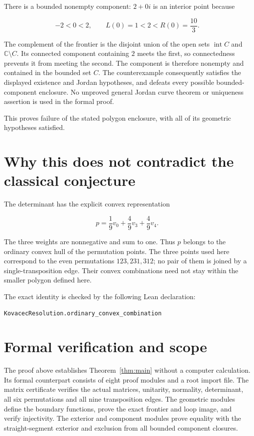 \documentclass[11pt]{article}
\begin{document}
There is a bounded nonempty component: \(2+0i\) is an interior point
because

\[
-2<0<2,\qquad L(0)=1<2<R(0)=\frac{10}{3}.
\]

The complement of the frontier is the disjoint union of the open sets $\operatorname{int}C$ and $\mathbb C\setminus C$. Its connected component containing $2$ meets the first, so connectedness prevents it from meeting the second. The component is therefore nonempty and contained in the bounded set $C$. The counterexample consequently satisfies the displayed
existence and Jordan hypotheses, and defeats every possible
bounded-component enclosure. No unproved general Jordan curve theorem or
uniqueness assertion is used in the formal proof.

This proves failure of the stated polygon enclosure, with all of its geometric hypotheses satisfied.

\section{Why this does not contradict the classical conjecture}\label{why-this-does-not-contradict-the-classical-conjecture}

The determinant has the explicit convex representation

\[
p=\frac19v_0+\frac49v_3+\frac49v_4.
\]

The three weights are nonnegative and sum to one. Thus \(p\) belongs to
the ordinary convex hull of the permutation points. The three points
used here correspond to the even permutations \(123,231,312\); no pair
of them is joined by a single-transposition edge. Their convex
combinations need not stay within the smaller polygon defined here.

The exact identity is checked by the following Lean declaration:

\begin{verbatim}
KovacecResolution.ordinary_convex_combination
\end{verbatim}


\section{Formal verification and scope}
The proof above establishes Theorem~\ref{thm:main} without a computer calculation. Its formal counterpart consists of eight proof modules and a root import file. The matrix certificate verifies the actual matrices, unitarity, normality, determinant, all six permutations and all nine transposition edges. The geometric modules define the boundary functions, prove the exact frontier and loop image, and verify injectivity. The exterior and component modules prove equality with the straight-segment exterior and exclusion from all bounded component closures.
\end{document}
